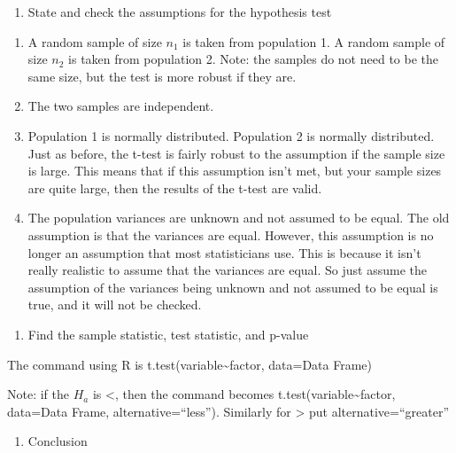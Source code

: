 \documentclass[]{book}
\providecommand{\tightlist}{%
  \setlength{\itemsep}{0pt}\setlength{\parskip}{0pt}}
\begin{document}
\begin{enumerate}
\def\labelenumi{\arabic{enumi}.}
\setcounter{enumi}{2}
\tightlist
\item
  State and check the assumptions for the hypothesis test
\end{enumerate}

\begin{enumerate}
\def\labelenumi{\alph{enumi}.}
\item
  A random sample of size \(n_1\) is taken from population 1. A random sample of size \(n_2\) is taken from population 2. Note: the samples do not need to be the same size, but the test is more robust if they are.
\item
  The two samples are independent.
\item
  Population 1 is normally distributed. Population 2 is normally distributed. Just as before, the t-test is fairly robust to the assumption if the sample size is large. This means that if this assumption isn't met, but your sample sizes are quite large, then the results of the t-test are valid.
\item
  The population variances are unknown and not assumed to be equal. The old assumption is that the variances are equal. However, this assumption is no longer an assumption that most statisticians use. This is because it isn't really realistic to assume that the variances are equal. So just assume the assumption of the variances being unknown and not assumed to be equal is true, and it will not be checked.
\end{enumerate}

\begin{enumerate}
\def\labelenumi{\arabic{enumi}.}
\setcounter{enumi}{3}
\tightlist
\item
  Find the sample statistic, test statistic, and p-value
\end{enumerate}

The command using R is t.test(variable\textasciitilde{}factor, data=Data Frame)

Note: if the \(H_a\) is \textless{}, then the command becomes t.test(variable\textasciitilde{}factor, data=Data Frame, alternative=``less''). Similarly for \textgreater{} put alternative=``greater''

\begin{enumerate}
\def\labelenumi{\arabic{enumi}.}
\setcounter{enumi}{4}
\tightlist
\item
  Conclusion
\end{enumerate}
\end{document}
